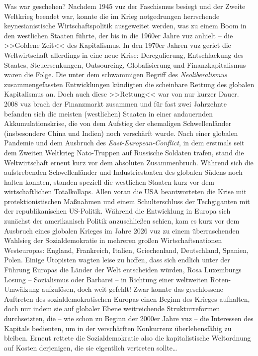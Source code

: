Was war geschehen? Nachdem 1945 \ac{vuz} der Faschismus besiegt und der Zweite
Weltkrieg beendet war, konnte die im Krieg notgedrungen herrschende
keynesianistische Wirtschaftspolitik ausgeweitet werden, was zu einem Boom in 
den westlichen Staaten führte, der bis in die 1960er Jahre \ac{vuz} anhielt --
die >>Goldene Zeit<< des Kapitalismus.
In den 1970er Jahren \ac{vuz} geriet die Weltwirtschaft allerdings in eine neue
Krise: Deregulierung, Entschlackung des Staates, Steuersenkungen, Outsourcing,
Globalisierung und Finanzkapitalismus waren die Folge. 
Die unter dem schwammigen Begriff des \emph{Neoliberalismus} zusammengefassten
Entwicklungen kündigten die scheinbare Rettung des globalen
Kapitalismus an.
Doch auch diese >>Rettung<< war von nur kurzer Dauer. 
2008 \ac{vuz} brach der Finanzmarkt zusammen und für fast zwei Jahrzehnte
befanden sich die meisten (westlichen) Staaten in einer andauernden
Akkumulationskrise, die von dem Aufstieg der ehemaligen Schwellenländer
(insbesondere China und Indien) noch verschärft wurde. 
Nach einer globalen Pandemie und dem Ausbruch des \emph{East-European-Conflict},
in dem erstmals seit dem Zweiten Weltkrieg Nato-Truppen auf Russische Soldaten
trafen, stand die Weltwirtschaft erneut kurz vor dem absoluten Zusammenbruch. 
Während sich die aufstrebenden Schwellenländer und Industriestaaten des
globalen Südens noch halten konnten, standen speziell die westlichen Staaten
kurz vor dem wirtschaftlichen Totalkollaps. 
Allen voran die USA beantworteten die Krise mit protektionistischen Maßnahmen
und einem Schulterschluss der Techgiganten mit der republikanischen US-Politik.
Während die Entwicklung in Europa sich zunächst der amerikanisch Politik
anzuschließen schien, kam es kurz vor dem Ausbruch eines globalen Krieges im
Jahre 2026 \ac{vuz} zu einem überraschenden Wahlsieg der Sozialdemokratie in
mehreren großen Wirtschaftsnationen Westeuropas: England, Frankreich, Italien,
Griechenland, Deutschland, Spanien, Polen.
Einige Utopisten wagten leise zu hoffen, dass sich endlich unter der Führung
Europas die Länder der Welt entscheiden würden, Rosa Luxemburgs Losung --
Sozialismus oder Barbarei -- in Richtung einer weltweiten Roten-Umwälzung
aufzulösen, doch weit gefehlt!
Zwar konnte das geschlossene Auftreten des sozialdemokratischen Europas einen
Beginn des Krieges aufhalten, doch nur indem sie auf globaler Ebene
weitreichende Strukturreformen durchsetzten, die -- wie schon zu Beginn der
2000er Jahre \ac{vuz} -- die Interessen des Kapitals bedienten, um in der
verschärften Konkurrenz überlebensfähig zu bleiben.
Erneut rettete die Sozialdemokratie also die kapitalistische Weltordnung auf 
Kosten derjenigen, die sie eigentlich vertreten sollte\dots

